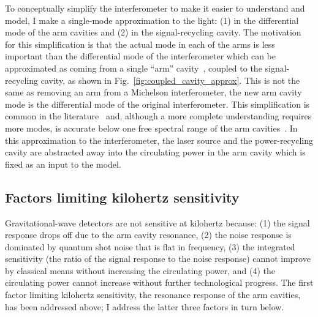 To conceptually simplify the interferometer to make it easier to understand and model, I make a single-mode approximation to the light: (1) in the differential mode of the arm cavities and (2) in the signal-recycling cavity. %
The motivation for this simplification is that the actual mode in each of the arms is less important than the differential mode of the interferometer which can be approximated as coming from a single ``arm'' cavity~\cite{}, coupled to the signal-recycling cavity, as shown in Fig.~\ref{fig:coupled_cavity_approx}. This is not the same as removing an arm from a Michelson interferometer, the new arm cavity mode is the differential mode of the original interferometer. 
This simplification is common in the literature~\cite{Korobko2019,Adya2020} and, although a more complete understanding requires more modes, is accurate below one free spectral range of the arm cavities~\cite{Miaoetal2015,}. In this approximation to the interferometer, the laser source and the power-recycling cavity are abstracted away into the circulating power in the arm cavity which is fixed as an input to the model.


\subsection{Factors limiting kilohertz sensitivity}

Gravitational-wave detectors are not sensitive at kilohertz because: (1) the signal response drops off due to the arm cavity resonance, (2) the noise response is dominated by quantum shot noise that is flat in frequency, (3) the integrated sensitivity (the ratio of the signal response to the noise response) cannot improve by classical means without increasing the circulating power, and (4) the circulating power cannot increase without further technological progress.
The first factor limiting kilohertz sensitivity, the resonance response of the arm cavities, has been addressed above; I address the latter three factors in turn below.


